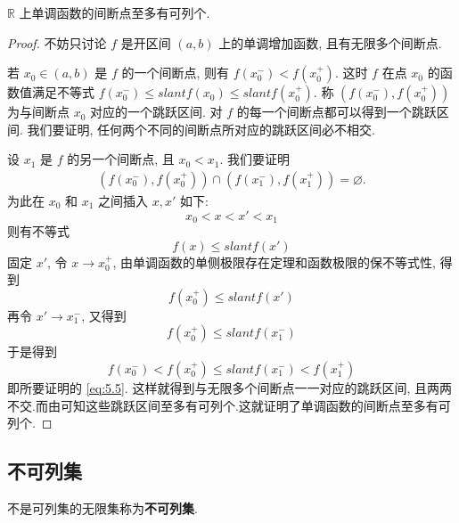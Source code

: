 \documentclass[../../main.tex]{subfiles}
\begin{document}
\begin{proposition}\label{proposition:实轴上单调函数至多有可列个间断点}
$\mathbb{R}$ 上单调函数的间断点至多有可列个.
\end{proposition}
\begin{proof}
不妨只讨论 \( f \) 是开区间 \( (a,b) \) 上的单调增加函数, 且有无限多个间断点.

若 \( x_0 \in (a,b) \) 是 \( f \) 的一个间断点, 则有 \( f(x_0^-) < f(x_0^+) \). 这时 \( f \) 在点 \( x_0 \) 的函数值满足不等式 \( f(x_0^-) \leqslant slant f(x_0) \leqslant slant f(x_0^+) \). 称 \( (f(x_0^-), f(x_0^+)) \) 为与间断点 \( x_0 \) 对应的一个跳跃区间.
对 \( f \) 的每一个间断点都可以得到一个跳跃区间. 我们要证明, 任何两个不同的间断点所对应的跳跃区间必不相交.

设 \( x_1 \) 是 \( f \) 的另一个间断点, 且 \( x_0 < x_1 \). 我们要证明
\begin{align} \label{eq:5.5}
(f(x_0^-), f(x_0^+)) \cap (f(x_1^-), f(x_1^+)) = \varnothing.
\end{align}
为此在 \( x_0 \) 和 \( x_1 \) 之间插入 \( x, x' \) 如下:
\[
x_0 < x < x' < x_1
\]
则有不等式
\[
f(x) \leqslant slant f(x')
\]
固定 \( x' \), 令 \( x \to x_0^+ \), 由单调函数的单侧极限存在定理和函数极限的保不等式性, 得到
\[
f(x_0^+) \leqslant slant f(x')
\]
再令 \( x' \to x_1^- \), 又得到
\[
f(x_0^+) \leqslant slant f(x_1^-)
\]
于是得到
\[
f(x_0^-) < f(x_0^+) \leqslant slant f(x_1^-) < f(x_1^+)
\]
即所要证明的 \eqref{eq:5.5}.
这样就得到与无限多个间断点一一对应的跳跃区间, 且两两不交.而由可知这些跳跃区间至多有可列个.这就证明了单调函数的间断点至多有可列个.
\end{proof}



\subsection{不可列集}

\begin{definition}[不可列集]
不是可列集的无限集称为\textbf{不可列集}.
\end{definition}
\end{document}
